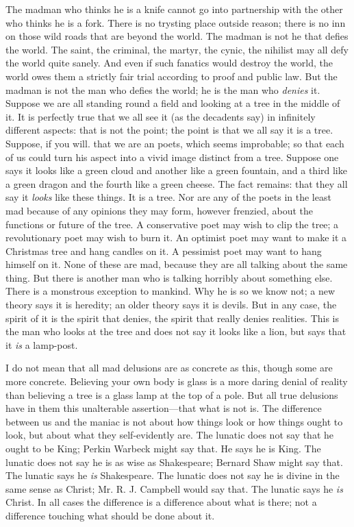\documentclass{book}
\begin{document}
The madman who thinks he is a knife cannot go into partnership with the other who thinks he is a fork. There is no trysting place outside reason; there is no inn on those wild roads that are beyond the world. The madman is not he that defies the world. The saint, the criminal, the martyr, the cynic, the nihilist may all defy the world quite sanely. And even if such fanatics would destroy the world, the world owes them a strictly fair trial according to proof and public law. But the madman is not the man who defies the world; he is the man who \emph{denies} it. Suppose we are all standing round a field and looking at a tree in the middle of it. It is perfectly true that we all see it (as the decadents say) in infinitely different aspects: that is not the point; the point is that we all say it is a tree. Suppose, if you will. that we are an poets, which seems improbable; so that each of us could turn his aspect into a vivid image distinct from a tree. Suppose one says it looks like a green cloud and another like a green fountain, and a third like a green dragon and the fourth like a green cheese. The fact remains: that they all say it \emph{looks} like these things. It is a tree. Nor are any of the poets in the least mad because of any opinions they may form, however frenzied, about the functions or future of the tree. A conservative poet may wish to clip the tree; a revolutionary poet may wish to burn it. An optimist poet may want to make it a Christmas tree and hang candles on it. A pessimist poet may want to hang himself on it. None of these are mad, because they are all talking about the same thing. But there is another man who is talking horribly about something else. There is a monstrous exception to mankind. Why he is so we know not; a new theory says it is heredity; an older theory says it is devils. But in any case, the spirit of it is the spirit that denies, the spirit that really denies realities. This is the man who looks at the tree and does not say it looks like a lion, but says that it \emph{is} a lamp-post.

I do not mean that all mad delusions are as concrete as this, though some are more concrete. Believing your own body is glass is a more daring denial of reality than believing a tree is a glass lamp at the top of a pole. But all true delusions have in them this unalterable assertion—that what is not is. The difference between us and the maniac is not about how things look or how things ought to look, but about what they self-evidently are. The lunatic does not say that he ought to be King; Perkin Warbeck might say that. He says he is King. The lunatic does not say he is as wise as Shakespeare; Bernard Shaw might say that. The lunatic says he \emph{is} Shakespeare. The lunatic does not say he is divine in the same sense as Christ; Mr. R. J. Campbell would say that. The lunatic says he \emph{is} Christ. In all cases the difference is a difference about what is there; not a difference touching what should be done about it.
\end{document}

